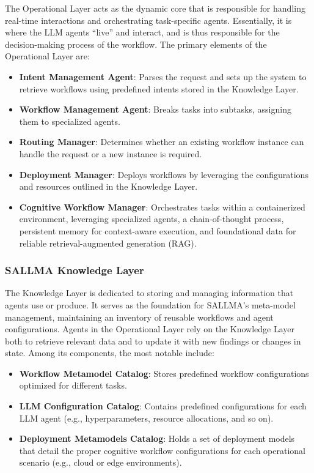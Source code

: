 The Operational Layer acts as the dynamic core that is responsible for handling real-time interactions and orchestrating task-specific agents. Essentially, it is where the LLM agents “live” and interact, and is thus responsible for the decision-making process of the workflow. The primary elements of the Operational Layer are:

\begin{itemize}[leftmargin=*, label=--]
    \item\textbf{Intent Management Agent}: Parses the request and sets up the system to retrieve workflows using predefined intents stored in the Knowledge Layer.
    \item\textbf{Workflow Management Agent}: Breaks tasks into subtasks, assigning them to specialized agents.
    \item\textbf{Routing Manager}: Determines whether an existing workflow instance can handle the request or a new instance is required.
    \item\textbf{Deployment Manager}: Deploys workflows by leveraging the configurations and resources outlined in the Knowledge Layer.
    \item\textbf{Cognitive Workflow Manager}: Orchestrates tasks within a containerized environment, leveraging specialized agents, a chain-of-thought process, persistent memory for context-aware execution, and foundational data for reliable retrieval-augmented generation (RAG).
\end{itemize}





\subsubsection{SALLMA Knowledge Layer}
The Knowledge Layer is dedicated to storing and managing information that agents use or produce. It serves as the foundation for SALLMA's meta-model management, maintaining an inventory of reusable workflows and agent configurations. Agents in the Operational Layer rely on the Knowledge Layer both to retrieve relevant data and to update it with new findings or changes in state. Among its components, the most notable include:

\begin{itemize}[leftmargin=*, label=--]
    \item\textbf{Workflow Metamodel Catalog}: Stores predefined workflow configurations optimized for different tasks.
    
    \item\textbf{LLM Configuration Catalog}:  Contains predefined configurations for each LLM agent (e.g., hyperparameters, resource allocations, and so on).

    \item\textbf{Deployment Metamodels Catalog}: Holds a set of deployment models that detail the proper cognitive workflow configurations for each operational scenario (e.g., cloud or edge environments).
\end{itemize}






